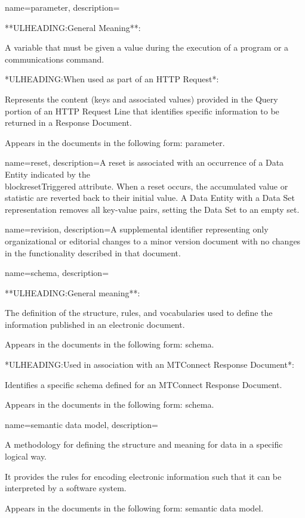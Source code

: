 {
    name={parameter},
	description={
	**ULHEADING:General Meaning**:

	A variable that must be given a value during the execution of a program or a communications command.

	*ULHEADING:When used as part of an \gls{HTTP Request}*:

	Represents the content (keys and associated values) provided in the \gls{Query} portion of an \gls{HTTP Request Line} that identifies specific information to be returned in a \gls{Response Document}.

	Appears in the documents in the following form: parameter.
}
}

{
    name={reset},
	description={A reset is associated with an occurrence of a \gls{Data Entity} indicated by the \\block{resetTriggered} attribute. When a reset occurs, the accumulated value or statistic are reverted back to their initial value. A \gls{Data Entity} with a \gls{Data Set} representation removes all \gls{key-value pairs}, setting the \gls{Data Set} to an empty set.}
}

{
    name={revision},
	description={A supplemental identifier representing only organizational or editorial changes to a \gls{minor} version document with no changes in the functionality described in that document.}
}

{
    name={schema},
	description={
	**ULHEADING:General meaning**:

	The definition of the structure, rules, and vocabularies used to define the information published in an electronic document.

	Appears in the documents in the following form: schema.

	*ULHEADING:Used in association with an \gls{MTConnect Response Document}*:

	Identifies a specific schema defined for an \gls{MTConnect Response Document}.

	Appears in the documents in the following form: \gls{schema}.
}
}

{
    name={semantic data model},
	description={
	A methodology for defining the structure and meaning for data in a specific logical way.  

	It provides the rules for encoding electronic information such that it can be interpreted by a software system.  

	Appears in the documents in the following form: \gls{semantic data model}.
}
}

